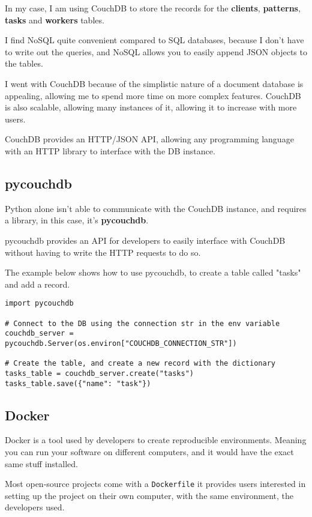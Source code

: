 In my case, I am using CouchDB to store the records for the
\textbf{clients}, \textbf{patterns}, \textbf{tasks} and \textbf{workers} tables.

I find NoSQL quite convenient compared to SQL databases,
because I don't have to write out the queries,
and NoSQL allows you to easily append JSON objects to the tables.

I went with CouchDB because of the simplistic nature of
a document database is appealing,
allowing me to spend more time on more complex features.
CouchDB is also scalable, allowing many instances of it,
allowing it to increase with more users.

CouchDB provides an HTTP/JSON API, allowing any programming language
with an HTTP library to interface with the DB instance.

\subsection{pycouchdb}
Python alone isn't able to communicate with the CouchDB instance,
and requires a library, in this case, it's \textbf{pycouchdb}.

pycouchdb provides an API for developers to easily interface with
CouchDB without having to write the HTTP requests to do so.

The example below shows how to use pycouchdb,
to create a table called "tasks" and add a record.

\begin{lstlisting}
import pycouchdb

# Connect to the DB using the connection str in the env variable
couchdb_server = pycouchdb.Server(os.environ["COUCHDB_CONNECTION_STR"])

# Create the table, and create a new record with the dictionary
tasks_table = couchdb_server.create("tasks")
tasks_table.save({"name": "task"})
\end{lstlisting}


\subsection{Docker}
Docker is a tool used by developers to create reproducible environments.
Meaning you can run your software on different computers,
and it would have the exact same stuff installed.

Most open-source projects come with a \texttt{Dockerfile} it provides
users interested in setting up the project on their own computer,
with the same environment, the developers used.


